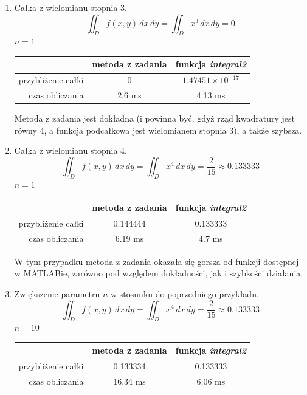 \documentclass[12pt]{article}
\begin{document}
	\begin{enumerate}[label=\textbf{Przykład \arabic*}]
		\item
		Całka z wielomianu stopnia 3.
		$$\iint_D f(x, y) \,dx\,dy = \iint_D x^3 \,dx\,dy = 0$$
		$n = 1$
		
		\begin{table}[H]
			\centering
			\begin{tabular}{|r|c|c|}
				\hline
				                   & metoda z zadania & funkcja \textit{integral2} \\ \hline
				przybliżenie całki &        0         & $1.47451 \times 10^{-17}$  \\ \hline
				   czas obliczania &      2.6 ms      &          4.13 ms           \\ \hline
			\end{tabular}
		\end{table}
	
		Metoda z zadania jest dokładna (i powinna być, gdyż rząd kwadratury jest równy 4, a funkcja podcałkowa jest wielomianem stopnia 3), a także szybsza.
		
		
		
		\item
		Całka z wielomianu stopnia 4.
		$$\iint_D f(x, y) \,dx\,dy = \iint_D x^4 \,dx\,dy = \frac{2}{15} \approx 0.133333$$
		$n = 1$
		
		\begin{table}[H]
			\centering
			\begin{tabular}{|r|c|c|}
				\hline
				                   & metoda z zadania & funkcja \textit{integral2} \\ \hline
				przybliżenie całki &     0.144444     &          0.133333          \\ \hline
				   czas obliczania &     6.19 ms      &           4.7 ms           \\ \hline
			\end{tabular}
		\end{table}
	
		W tym przypadku metoda z zadania okazała się gorsza od funkcji dostępnej w MATLABie, zarówno pod względem dokładności, jak i szybkości działania.
		
		
		\item
		Zwiększenie parametru $n$ w stosunku do poprzedniego przykładu.
		$$\iint_D f(x, y) \,dx\,dy = \iint_D x^4 \,dx\,dy = \frac{2}{15} \approx 0.133333$$
		$n = 10$
		
		\begin{table}[H]
			\centering
			\begin{tabular}{|r|c|c|}
				\hline
				                   & metoda z zadania & funkcja \textit{integral2} \\ \hline
				przybliżenie całki &     0.133334     &          0.133333          \\ \hline
				   czas obliczania &     16.34 ms     &          6.06 ms           \\ \hline
			\end{tabular}
		\end{table}
	

\end{enumerate}
\end{document}
